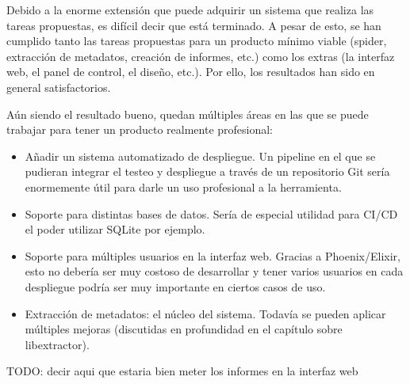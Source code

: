 Debido a la enorme extensión que puede adquirir un sistema que realiza las tareas propuestas, es difícil decir que está terminado. A pesar de esto, se han cumplido tanto las tareas propuestas para un producto mínimo viable (spider, extracción de metadatos, creación de informes, etc.) como los extras (la interfaz web, el panel de control, el diseño, etc.). Por ello, los resultados han sido en general satisfactorios.

Aún siendo el resultado bueno, quedan múltiples áreas en las que se puede trabajar para tener un producto realmente profesional:

\begin{itemize}
  \item Añadir un sistema automatizado de despliegue. Un pipeline en el que se pudieran integrar el testeo y despliegue a través de un repositorio Git sería enormemente útil para darle un uso profesional a la herramienta.
  \item Soporte para distintas bases de datos. Sería de especial utilidad para CI/CD el poder utilizar SQLite por ejemplo.
  \item Soporte para múltiples usuarios en la interfaz web. Gracias a Phoenix/Elixir, esto no debería ser muy costoso de desarrollar y tener varios usuarios en cada despliegue podría ser muy importante en ciertos casos de uso.
  \item Extracción de metadatos: el núcleo del sistema. Todavía se pueden aplicar múltiples mejoras (discutidas en profundidad en el capítulo sobre libextractor).
\end{itemize}

TODO: decir aqui que estaria bien meter los informes en la interfaz web